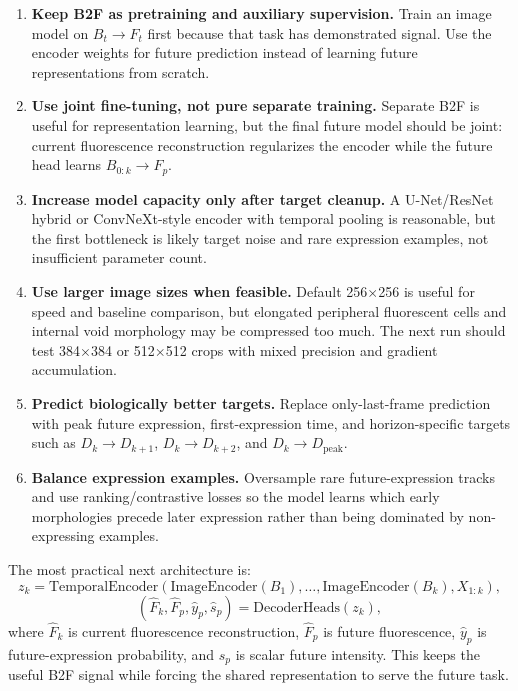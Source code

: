 \documentclass[11pt]{article}
\begin{document}
\begin{enumerate}
\item \textbf{Keep B2F as pretraining and auxiliary supervision.} Train an image model on $B_t \rightarrow F_t$ first because that task has demonstrated signal. Use the encoder weights for future prediction instead of learning future representations from scratch.
\item \textbf{Use joint fine-tuning, not pure separate training.} Separate B2F is useful for representation learning, but the final future model should be joint: current fluorescence reconstruction regularizes the encoder while the future head learns $B_{0:k} \rightarrow F_p$.
\item \textbf{Increase model capacity only after target cleanup.} A U-Net/ResNet hybrid or ConvNeXt-style encoder with temporal pooling is reasonable, but the first bottleneck is likely target noise and rare expression examples, not insufficient parameter count.
\item \textbf{Use larger image sizes when feasible.} Default 256$\times$256 is useful for speed and baseline comparison, but elongated peripheral fluorescent cells and internal void morphology may be compressed too much. The next run should test 384$\times$384 or 512$\times$512 crops with mixed precision and gradient accumulation.
\item \textbf{Predict biologically better targets.} Replace only-last-frame prediction with peak future expression, first-expression time, and horizon-specific targets such as $D_k \rightarrow D_{k+1}$, $D_k \rightarrow D_{k+2}$, and $D_k \rightarrow D_{\mathrm{peak}}$.
\item \textbf{Balance expression examples.} Oversample rare future-expression tracks and use ranking/contrastive losses so the model learns which early morphologies precede later expression rather than being dominated by non-expressing examples.
\end{enumerate}

The most practical next architecture is:
\begin{equation}
z_k = \mathrm{TemporalEncoder}\left(\mathrm{ImageEncoder}(B_1),\ldots,\mathrm{ImageEncoder}(B_k), X_{1:k}\right),
\end{equation}
\begin{equation}
(\hat{F}_k, \hat{F}_{p}, \hat{y}_{p}, \hat{s}_{p}) =
\mathrm{DecoderHeads}(z_k),
\end{equation}
where $\hat{F}_k$ is current fluorescence reconstruction, $\hat{F}_p$ is future fluorescence, $\hat{y}_p$ is future-expression probability, and $\hat{s}_p$ is scalar future intensity. This keeps the useful B2F signal while forcing the shared representation to serve the future task.
\end{document}
